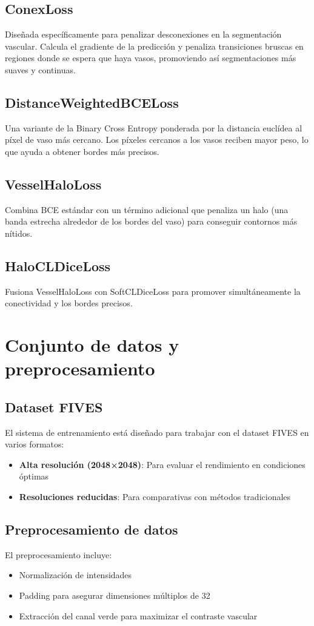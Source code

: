 \documentclass[11pt,a4paper]{report} %
\begin{document}
\subsection{ConexLoss}
Diseñada específicamente para penalizar desconexiones en la segmentación vascular. Calcula el gradiente de la predicción y penaliza transiciones bruscas en regiones donde se espera que haya vasos, promoviendo así segmentaciones más suaves y continuas.

\subsection{DistanceWeightedBCELoss}
Una variante de la Binary Cross Entropy ponderada por la distancia euclídea al píxel de vaso más cercano. Los píxeles cercanos a los vasos reciben mayor peso, lo que ayuda a obtener bordes más precisos.

\subsection{VesselHaloLoss}
Combina BCE estándar con un término adicional que penaliza un halo (una banda estrecha alrededor de los bordes del vaso) para conseguir contornos más nítidos.

\subsection{HaloCLDiceLoss}
Fusiona VesselHaloLoss con SoftCLDiceLoss para promover simultáneamente la conectividad y los bordes precisos.

\section{Conjunto de datos y preprocesamiento}
\subsection{Dataset FIVES}
El sistema de entrenamiento está diseñado para trabajar con el dataset FIVES en varios formatos:
\begin{itemize}
  \item \textbf{Alta resolución (2048×2048)}: Para evaluar el rendimiento en condiciones óptimas
  \item \textbf{Resoluciones reducidas}: Para comparativas con métodos tradicionales
\end{itemize}

\subsection{Preprocesamiento de datos}
El preprocesamiento incluye:
\begin{itemize}
  \item Normalización de intensidades
  \item Padding para asegurar dimensiones múltiplos de 32
  \item Extracción del canal verde para maximizar el contraste vascular
\end{itemize}
\end{document}
